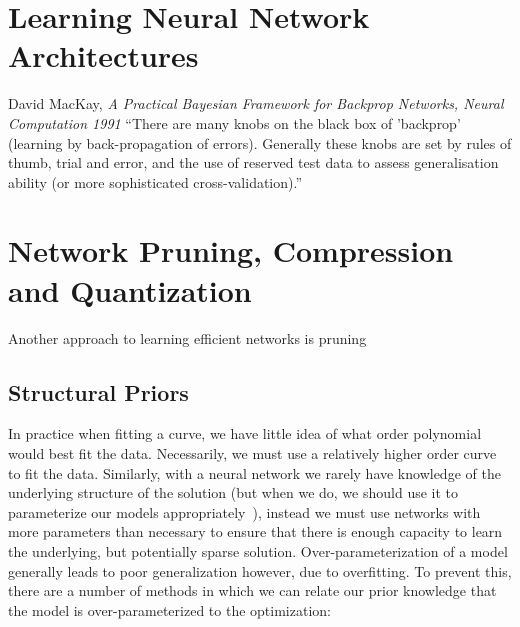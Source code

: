 \documentclass[thesis]{subfiles}
\begin{document}
	
	\section{Learning Neural Network Architectures}
	\begin{chapquote}{David MacKay, \textit{A Practical Bayesian Framework for Backprop Networks, Neural Computation 1991}}
		``There are many knobs on the black box of 'backprop' (learning by back-propagation of
		errors). Generally these knobs are set by rules of thumb, trial and error, and the use of reserved test data to assess generalisation ability (or more sophisticated cross-validation).''
	\end{chapquote}
	
	\citet{mezard1989learning,MacKay91,mackay1992practical}
	
	\section{Network Pruning, Compression and Quantization}
	Another approach to learning efficient networks is pruning
	\citet{lecun1989optimal,sietsma1988neural,Xing2009,journals/corr/HanMD15,ullrich2017soft,}
	
	
	\subsection{Structural Priors}
	In practice when fitting a curve, we have little idea of what order polynomial would best fit the data. Necessarily, we must use a relatively higher order curve to fit the data. Similarly, with a neural network we rarely have knowledge of the underlying structure of the solution (but when we do, we should use it to parameterize our models appropriately~\citep{jain2016structural}), instead we must use networks with more parameters than necessary to ensure that there is enough capacity to learn the underlying, but potentially sparse solution. Over-parameterization of a model generally leads to poor generalization however, due to overfitting. To prevent this, there are a number of methods in which we can relate our prior knowledge that the model is over-parameterized to the optimization:
	
\end{document}
